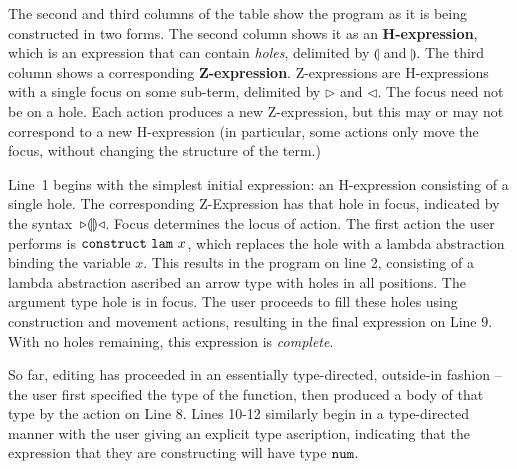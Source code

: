 The second and third columns of the
table show the program as it is being constructed in two forms. The second column shows it as an \textbf{H-expression}, which is an expression that can contain \emph{holes}, delimited by $\llparenthesis$ and $\rrparenthesis$. The third column shows a corresponding \textbf{Z-expression}. Z-expressions are H-expressions with a single focus on some sub-term, delimited by $\triangleright$ and $\triangleleft$. The focus need not be on a hole.
Each action produces a new Z-expression, but this may or may not correspond to a new H-expression (in particular, some actions only move the focus, without changing the structure of the term.)

Line~1 begins with the simplest initial expression: an H-expression
consisting of a single hole. The corresponding Z-Expression has that hole in focus,
indicated by the syntax~${\triangleright}{\llparenthesis\rrparenthesis}{\triangleleft}$. Focus determines the locus of action. The first action the user performs is $\mathtt{construct}~\mathtt{lam}~x$, which replaces the hole with a lambda abstraction binding the variable $x$. This results in the program on line
2, consisting of a lambda abstraction ascribed an arrow type with holes in all positions. The argument type hole is in focus. The
user proceeds to fill these holes using construction and movement actions, resulting in the final expression on Line 9. With no holes remaining, this expression is \emph{complete}.%

So far, editing has proceeded in an essentially type-directed, outside-in fashion -- the user first specified the type of the function, then produced a body of that type by the action on Line 8. Lines 10-12 similarly begin in a type-directed manner with the user giving an explicit type ascription, indicating that the expression that they are constructing will have type $\texttt{num}$. 

